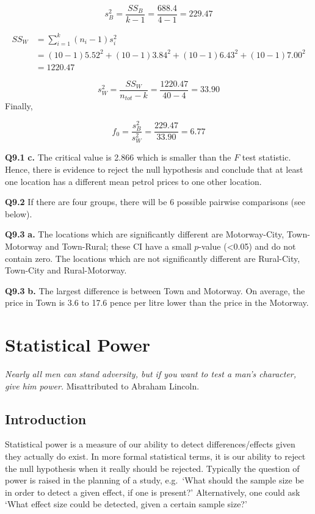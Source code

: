 \documentclass[
  oneside]{krantz}
\begin{document}
\[s^2_B = \frac{SS_B}{k-1} = \frac{688.4}{4-1} = 229.47\]

\begin{equation}
\begin{split}
SS_W & = \sum_{i=1}^{k}(n_i-1)s_i^2 \\
& = (10-1)5.52^2 + (10-1)3.84^2 + (10-1)6.43^2 + (10-1)7.00^2\\
& = 1220.47
\end{split}
\end{equation}

\[s^2_W = \frac{SS_W}{n_{tot}-k} = \frac{1220.47}{40 - 4} = 33.90\]
Finally,

\[f_0 = \frac{s^2_B}{s^2_W} = \frac{229.47}{33.90} = 6.77\]

\textbf{Q9.1} \textbf{c.} The critical value is 2.866 which is smaller than the \(F\) test statistic. Hence, there is evidence to reject the null hypothesis and conclude that at least one location has a different mean petrol prices to one other location.

\textbf{Q9.2} If there are four groups, there will be 6 possible pairwise comparisons (see below).

\textbf{Q9.3} \textbf{a.} The locations which are significantly different are Motorway-City, Town-Motorway and Town-Rural; these CI have a small \(p\)-value (\textless0.05) and do not contain zero. The locations which are not significantly different are Rural-City, Town-City and Rural-Motorway.

\textbf{Q9.3} \textbf{b.} The largest difference is between Town and Motorway. On average, the price in Town is 3.6 to 17.6 pence per litre lower than the price in the Motorway.

\hypertarget{power}{%
\chapter{Statistical Power}\label{power}}

\emph{Nearly all men can stand adversity, but if you want to test a man's character, give him power.}
Misattributed to Abraham Lincoln.

\hypertarget{INTpower}{%
\section{Introduction}\label{INTpower}}

Statistical power is a measure of our ability to detect differences/effects given they actually do exist. In more formal statistical terms, it is our ability to reject the null hypothesis when it really should be rejected. Typically the question of power is raised in the planning of a study, e.g.~`What should the sample size be in order to detect a given effect, if one is present?' Alternatively, one could ask `What effect size could be detected, given a certain sample size?'
\end{document}
